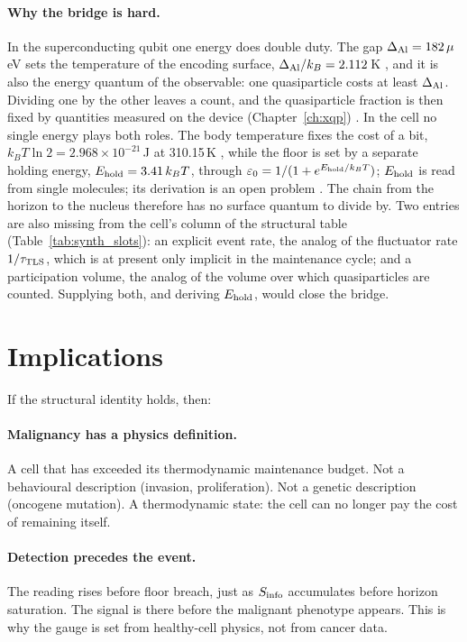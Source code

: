 \paragraph{Why the bridge is hard.} In the superconducting qubit one energy does double duty. The gap $\Delta_{\rm Al}=182\,\mu$eV sets the
temperature of the encoding surface, $\Delta_{\rm Al}/k_B=2.112$\,K \calc, and it is also the energy quantum of the observable: one quasiparticle
costs at least $\Delta_{\rm Al}$. Dividing one by the other leaves a count, and the quasiparticle fraction is then fixed by quantities measured on the
device (Chapter~\ref{ch:xqp}) \interp. In the cell no single energy plays both roles. The body temperature fixes the cost of a bit,
$k_BT\ln2=2.968\times10^{-21}$\,J at 310.15\,K \calc, while the floor is set by a separate holding energy, $E_{\rm hold}=3.41\,k_BT$, through
$\varepsilon_0=1/(1+e^{E_{\rm hold}/k_BT})$; $E_{\rm hold}$ is read from single molecules; its derivation is an open problem \measured. The chain from the horizon to the
nucleus therefore has no surface quantum to divide by. Two entries are also missing from the cell's column of the structural table
(Table~\ref{tab:synth_slots}): an explicit event rate, the analog of the fluctuator rate $1/\tau_{\rm TLS}$, which is at present only implicit in
the maintenance cycle; and a participation volume, the analog of the volume over which quasiparticles are counted. Supplying both, and deriving
$E_{\rm hold}$, would close the bridge. \openprob

\section{Implications}
If the structural identity holds, then:
\paragraph{Malignancy has a physics definition.} A cell that has exceeded its thermodynamic maintenance budget. Not a behavioural description
(invasion, proliferation). Not a genetic description (oncogene mutation). A thermodynamic state: the cell can no longer pay the cost of remaining
itself. \interp
\paragraph{Detection precedes the event.} The reading rises before floor breach, just as $S_{\rm info}$ accumulates before horizon saturation. The
signal is there before the malignant phenotype appears. This is why the gauge is set from healthy-cell physics, not from cancer data.
\prediction
